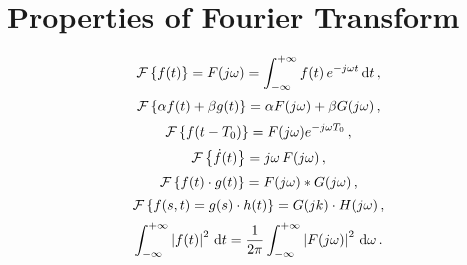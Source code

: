 \section*{Properties of Fourier Transform}
\begin{equation} \label{eq:fourier_definition}
    \mathcal{F}\left\{f(t)\right\} = F(j \omega) = \int_{-\infty}^{+\infty} f(t) \, e^{- j \omega t} \, \textnormal{d} t \, ,
\end{equation}
\begin{equation} \label{eq:fourier_linearity}
    \mathcal{F}\left\{\alpha f(t) + \beta g(t)\right\} = \alpha F(j \omega) + \beta G(j \omega) \, ,
\end{equation}
\begin{equation} \label{eq:fourier_delay}
    \mathcal{F}\left\{f(t - T_0)\right\} = F(j \omega) e^{-j \omega T_0}\, ,
\end{equation}
\begin{equation} \label{eq:fourier_diff}
    \mathcal{F}\left\{\dot{f}(t)\right\} = j \omega \, F(j \omega) \, ,
\end{equation}
\begin{equation} \label{eq:fourier_conv}
    \mathcal{F}\left\{f(t) \cdot g(t)\right\} = F(j \omega) \ast G(j \omega) \, ,
\end{equation}
\begin{equation} \label{eq:fourier2d_product}
    \mathcal{F}\left\{f(s, t) = g(s) \cdot h(t)\right\} = G(j k) \cdot H(j \omega) \, ,
\end{equation}
\begin{equation} \label{eq:fourier_parseval}
    \int_{-\infty}^{+\infty} \left\lvert f(t)\right\rvert^2 \, \textnormal{d}t = \frac{1}{2 \pi} \int_{-\infty}^{+\infty} \left\lvert F(j \omega)\right\rvert^2 \, \textnormal{d} \omega \, .
\end{equation}